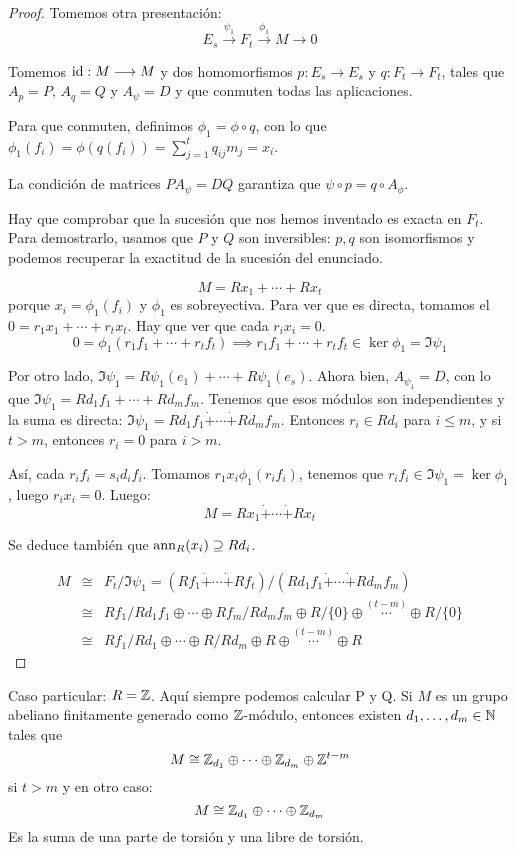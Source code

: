 \begin{proof}
  Tomemos otra presentación:
  \[
    E_s\overset{\psi_1}{\longrightarrow} F_t
    \overset{\phi_1}{\longrightarrow} M\longrightarrow 0
  \]

  Tomemos \(\operatorname{id}:M\longrightarrow M\) y dos homomorfismos
  \(p:E_s\longrightarrow E_s\) y
  \(q:F_t\longrightarrow F_t\), tales que \(A_p=P\),
  \(A_q=Q\) y \(A_\psi =D\) y que conmuten todas las aplicaciones.

  Para que conmuten, definimos \(\phi_1=\phi\circ q\),
  con lo que \(\phi_1(f_i)=\phi(q(f_i))=\sum_{j=1}^t q_{ij} m_j=x_i\).

  La condición de matrices \(PA_\psi=DQ\) garantiza que
  \(\psi\circ p=q\circ A_\phi\).

  Hay que comprobar que la sucesión que nos hemos inventado
  es exacta en \(F_t\). Para demostrarlo, usamos que \(P\) y \(Q\) son
  inversibles: \(p,q\) son isomorfismos y podemos recuperar la exactitud
  de la sucesión del enunciado.

  \[
    M=Rx_1+\cdots+Rx_t
  \]
  porque \(x_i=\phi_1(f_i)\) y \(\phi_1\) es sobreyectiva. Para ver que es
  directa, tomamos el \(0=r_1 x_1+\cdots+ r_t x_t\). Hay que ver
  que cada \(r_i x_i=0\).
  \[
    0=\phi_1(r_1 f_1+\cdots+r_t f_t)\implies
    r_1 f_1+\cdots+r_t f_t\in\ker\phi_1=\Im\psi_1
  \]

  Por otro lado, \(\Im\psi_1=R\psi_1(e_1)+\cdots+ R\psi_1(e_s)\).
  Ahora bien, \(A_{\psi_1}=D\), con lo que
  \(\Im\psi_1=Rd_1 f_1+\cdots +Rd_m f_m\). Tenemos que esos módulos
  son independientes y la suma es directa:
  \(\Im\psi_1=Rd_1 f_1\dot{+}\cdots\dot{+} Rd_m f_m\).
  Entonces \(r_i\in Rd_i\) para \(i\le m\),
  y si \(t>m\), entonces \(r_i=0\) para \(i>m\).

  Así, cada \(r_i f_i = s_i d_i f_i\).
  Tomamos \(r_1 x_i\phi_1(r_i f_i) \), tenemos que
  \(r_i f_i\in\Im\psi_1=\ker\phi_1\), luego \(r_i x_i=0\).
  Luego:
  \[
    M=Rx_1\dot{+}\cdots\dot{+}Rx_t
  \]

  Se deduce también que \(\operatorname{ann}_R(x_i)\supseteq Rd_i\).

  \begin{eqnarray*}
    M&\cong& F_t/\Im\psi_1=
    (Rf_1\dot{+}\cdots\dot{+}Rf_t)/
    (Rd_1f_1\dot{+}\cdots\dot{+}Rd_m f_m)\\
    &\cong&
    Rf_1/Rd_1 f_1\oplus\cdots\oplus Rf_m/Rd_m f_m
    \oplus R/\{0\}\oplus\overset{(t-m)}{\cdots}\oplus R/\{0\}\\
    &\cong&
    Rf_1/Rd_1\oplus\cdots\oplus R/Rd_m
    \oplus R\oplus\overset{(t-m)}{\cdots}\oplus R
  \end{eqnarray*}

\end{proof}

Caso particular: \(R=\mathbb{Z}\). Aquí siempre podemos calcular P y Q.
Si \(M\) es un grupo abeliano finitamente generado como \(\mathbb{Z}\)-módulo,
entonces existen \(d_1,\ldots, d_m\in\mathbb{N}\) tales que
\[
  M\cong \mathbb{Z}_{d_1}\oplus\cdots\oplus\mathbb{Z}_{d_m}\oplus\mathbb{Z}^{t-m}
\]
si \(t>m\) y en otro caso:
\[
  M\cong \mathbb{Z}_{d_1}\oplus\cdots\oplus\mathbb{Z}_{d_m}
\]
Es la suma de una parte de torsión y una libre de torsión.

